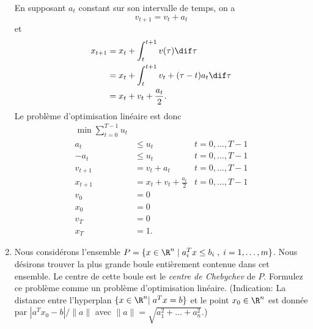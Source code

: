 \begin{enumerate}
    \begin{solution}
      En supposant $a_t$ constant sur son intervalle de temps, on a
      \[ v_{t+1} = v_t + a_t \]
      et
      \begin{align*}
        x_{t+1} &= x_t + \int_t^{t+1} v(\tau) \dif \tau \\
        &= x_t + \int_t^{t+1} v_t + (\tau-t)a_t \dif \tau \\
        &= x_t + v_t + \frac{a_t}{2}.
      \end{align*}
      Le problème d'optimisation linéaire est donc
      \begin{align*}
        \min \sum_{t=0}^{T-1} u_t\\
        a_t & \leq u_t & t = 0,\ldots,T-1\\
        -a_t & \leq u_t & t = 0,\ldots,T-1\\
        v_{t+1} & = v_t + a_t & t = 0,\ldots,T-1\\
        x_{t+1} & = x_t + v_t + \frac{a_t}{2} & t = 0,\ldots,T-1\\
        v_0 & = 0\\
        x_0 & = 0\\
        v_T & = 0\\
        x_T & = 1.
      \end{align*}
    \end{solution}



  \item Nous considérons l'ensemble $P=\{ x \in \R^n \; | \; a_i^T x \leq b_i \; , \;  i=1, \ldots, m \}$. Nous désirons trouver la
    plus grande boule entièrement contenue dans cet ensemble. Le centre de cette boule est  le {\it centre de Chebychev} de $P$.  Formulez
    ce problème comme un problème d'optimisation linéaire. (Indication:  La distance entre l'hyperplan $\{x \in \R^n | \;  a^Tx=b \}$ et le point $x_0 \in \R^n$
    est donnée par
    $|a^Tx_0 - b|/\|a\|$ avec $\|a\|=\sqrt{a_1^2+ \ldots + a_n^2}$.)


\end{enumerate}

